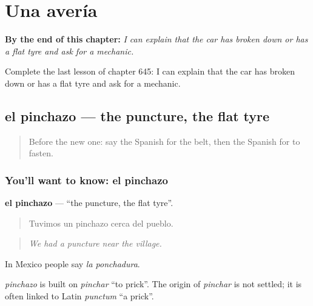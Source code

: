 
\chapter{Una avería}
\label{ch:es-una-averia}

\begin{chapteropening}
\textbf{By the end of this chapter:} \emph{I can explain that the car has broken down or has a flat tyre and ask for a mechanic.}

Complete the last lesson of chapter 645: I can explain that the car has broken down or has a flat tyre and ask for a mechanic.
\end{chapteropening}

\section[el pinchazo]{el pinchazo — the puncture, the flat tyre}

\label{lesson:ES-C645-pinchazo}



\begin{quote}
Before the new one: say the Spanish for the belt, then the Spanish for to fasten.
\end{quote}

\subsection*{You'll want to know: el pinchazo}
\textbf{el pinchazo} — \textquotedblleft{}the puncture, the flat tyre\textquotedblright{}.

\begin{quote}
Tuvimos un pinchazo cerca del pueblo.
\end{quote}

\begin{quote}
\emph{We had a puncture near the village.}
\end{quote}

In Mexico people say \emph{la ponchadura}.

\begin{cousinweb}
\emph{pinchazo} is built on \emph{pinchar} \textquotedblleft{}to prick\textquotedblright{}. The origin of \emph{pinchar} is not settled; it is often linked to Latin \emph{punctum} \textquotedblleft{}a prick\textquotedblright{}.
\end{cousinweb}


